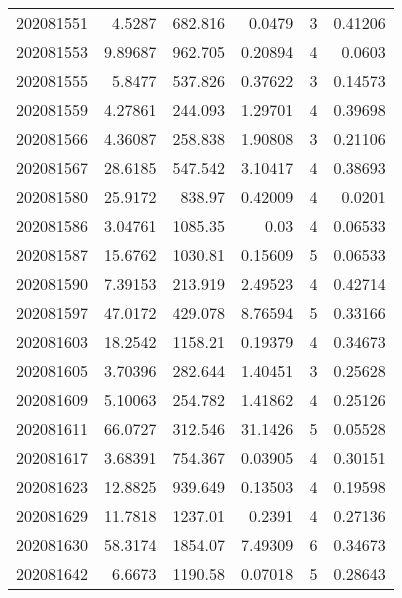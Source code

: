 \begin{tabular}{rrrrrr}
 202081551 &          4.5287  &      682.816  &            0.0479  &           3 & 0.41206 \\
 202081553 &          9.89687 &      962.705  &            0.20894 &           4 & 0.0603  \\
 202081555 &          5.8477  &      537.826  &            0.37622 &           3 & 0.14573 \\
 202081559 &          4.27861 &      244.093  &            1.29701 &           4 & 0.39698 \\
 202081566 &          4.36087 &      258.838  &            1.90808 &           3 & 0.21106 \\
 202081567 &         28.6185  &      547.542  &            3.10417 &           4 & 0.38693 \\
 202081580 &         25.9172  &      838.97   &            0.42009 &           4 & 0.0201  \\
 202081586 &          3.04761 &     1085.35   &            0.03    &           4 & 0.06533 \\
 202081587 &         15.6762  &     1030.81   &            0.15609 &           5 & 0.06533 \\
 202081590 &          7.39153 &      213.919  &            2.49523 &           4 & 0.42714 \\
 202081597 &         47.0172  &      429.078  &            8.76594 &           5 & 0.33166 \\
 202081603 &         18.2542  &     1158.21   &            0.19379 &           4 & 0.34673 \\
 202081605 &          3.70396 &      282.644  &            1.40451 &           3 & 0.25628 \\
 202081609 &          5.10063 &      254.782  &            1.41862 &           4 & 0.25126 \\
 202081611 &         66.0727  &      312.546  &           31.1426  &           5 & 0.05528 \\
 202081617 &          3.68391 &      754.367  &            0.03905 &           4 & 0.30151 \\
 202081623 &         12.8825  &      939.649  &            0.13503 &           4 & 0.19598 \\
 202081629 &         11.7818  &     1237.01   &            0.2391  &           4 & 0.27136 \\
 202081630 &         58.3174  &     1854.07   &            7.49309 &           6 & 0.34673 \\
 202081642 &          6.6673  &     1190.58   &            0.07018 &           5 & 0.28643 \\

\end{tabular}
